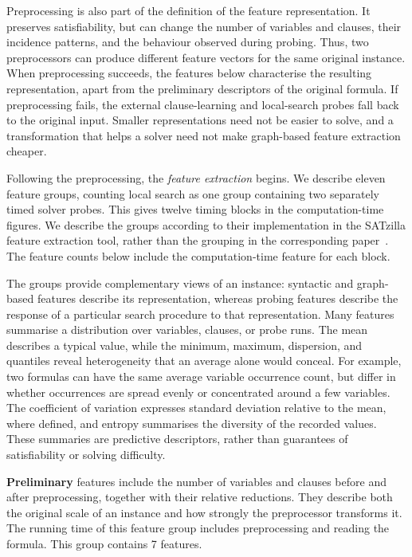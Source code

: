 Preprocessing is also part of the definition of the feature representation. It preserves satisfiability, but can change the number of variables and clauses, their incidence patterns, and the behaviour observed during probing. Thus, two preprocessors can produce different feature vectors for the same original instance. When preprocessing succeeds, the features below characterise the resulting representation, apart from the preliminary descriptors of the original formula. If preprocessing fails, the external clause-learning and local-search probes fall back to the original input. Smaller representations need not be easier to solve, and a transformation that helps a solver need not make graph-based feature extraction cheaper.

Following the preprocessing, the \emph{feature extraction} begins. We describe eleven feature groups, counting local search as one group containing two separately timed solver probes. This gives twelve timing blocks in the computation-time figures. We describe the groups according to their implementation in the SATzilla feature extraction tool, rather than the grouping in the corresponding paper~\cite{HutEtAl14}. The feature counts below include the computation-time feature for each block.

The groups provide complementary views of an instance: syntactic and graph-based features describe its representation, whereas probing features describe the response of a particular search procedure to that representation. Many features summarise a distribution over variables, clauses, or probe runs. The mean describes a typical value, while the minimum, maximum, dispersion, and quantiles reveal heterogeneity that an average alone would conceal. For example, two formulas can have the same average variable occurrence count, but differ in whether occurrences are spread evenly or concentrated around a few variables. The coefficient of variation expresses standard deviation relative to the mean, where defined, and entropy summarises the diversity of the recorded values. These summaries are predictive descriptors, rather than guarantees of satisfiability or solving difficulty.

\noindent\textbf{Preliminary} features include the number of variables and clauses before and after preprocessing, together with their relative reductions. They describe both the original scale of an instance and how strongly the preprocessor transforms it. The running time of this feature group includes preprocessing and reading the formula. This group contains 7 features.

